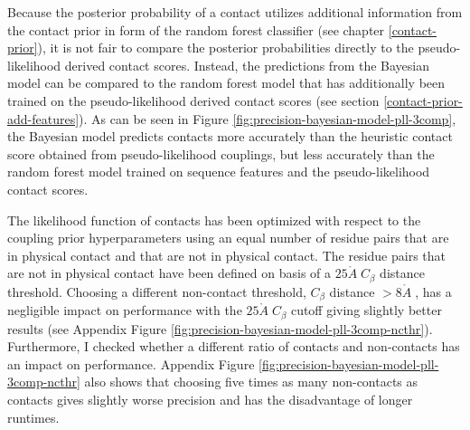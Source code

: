 \documentclass[11pt,a4paper,twoside]{book}
\newcommand{\Cb}{C_\beta}
\newcommand{\angstrom}{\mathring{A} \;}
\theoremstyle{definition}
\theoremstyle{definition}
\theoremstyle{remark}
\begin{document}
Because the posterior probability of a contact utilizes additional
information from the contact prior in form of the random forest
classifier (see chapter \ref{contact-prior}), it is not fair to compare
the posterior probabilities directly to the pseudo-likelihood derived
contact scores. Instead, the predictions from the Bayesian model can be
compared to the random forest model that has additionally been trained
on the pseudo-likelihood derived contact scores (see section
\ref{contact-prior-add-features}). As can be seen in Figure
\ref{fig:precision-bayesian-model-pll-3comp}, the Bayesian model
predicts contacts more accurately than the heuristic contact score
obtained from pseudo-likelihood couplings, but less accurately than the
random forest model trained on sequence features and the
pseudo-likelihood contact scores.

The likelihood function of contacts has been optimized with respect to
the coupling prior hyperparameters using an equal number of residue
pairs that are in physical contact and that are not in physical contact.
The residue pairs that are not in physical contact have been defined on
basis of a \(25 \angstrom \Cb\) distance threshold. Choosing a different
non-contact threshold, \(\Cb\) distance \(>8 \angstrom\), has a
negligible impact on performance with the \(25 \angstrom \Cb\) cutoff
giving slightly better results (see Appendix Figure
\ref{fig:precision-bayesian-model-pll-3comp-ncthr}). Furthermore, I
checked whether a different ratio of contacts and non-contacts has an
impact on performance. Appendix Figure
\ref{fig:precision-bayesian-model-pll-3comp-ncthr} also shows that
choosing five times as many non-contacts as contacts gives slightly
worse precision and has the disadvantage of longer runtimes.
\end{document}
